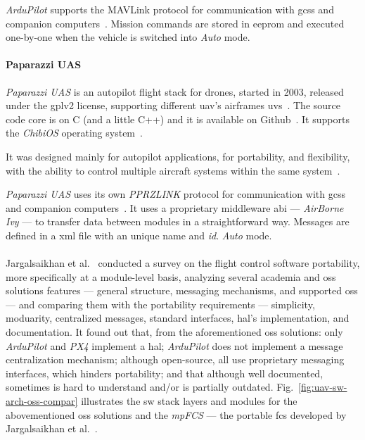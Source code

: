 \emph{ArduPilot} supports the MAVLink protocol for communication with
\glspl{gcs} and companion computers~\cite{arduPilot-home}. Mission commands are
stored in \gls{eeprom} and executed one-by-one when the vehicle is switched into
\emph{Auto} mode.


\paragraph{Paparazzi UAS}
%
\emph{Paparazzi UAS} is an autopilot flight stack for drones, started in 2003,
released under the \gls{gpl}v2 license, supporting different \gls{uav}'s airframes \glspl{uv}~\cite{paparazzi-home}. The source code core is on C (and a little C++) and it
is available on Github~\cite{paparazzi-github}.
It supports the \emph{ChibiOS} operating system~\cite{jargalsaikhan2022architectural}.

It was designed mainly for autopilot applications, for portability, and
flexibility, with the ability to control multiple aircraft systems within the
same system~\cite{paparazzi-home}.

\emph{Paparazzi UAS} uses its own \emph{PPRZLINK} protocol for communication
with \glspl{gcs} and companion computers~\cite{jargalsaikhan2022architectural}. It uses a proprietary middleware \gls{abi} ---
\emph{AirBorne Ivy} --- to transfer data between modules in a straightforward
way. Messages are defined in a \gls{xml} file with an unique name and \emph{id}.
\emph{Auto} mode.

\paragraph{}
Jargalsaikhan et al.~\cite{jargalsaikhan2022architectural} conducted a survey on the flight control software
portability, more specifically at a module-level basis, analyzing several
academia and \gls{oss} solutions features --- general structure, messaging
mechanisms, and supported \glspl{os} --- and comparing them with the portability
requirements --- simplicity, moduarity, centralized messages, standard
interfaces, \gls{hal}'s implementation, and documentation. It found out that,
from the aforementioned \gls{oss} solutions: only \emph{ArduPilot} and
\emph{PX4} implement a \gls{hal}; \emph{ArduPilot} does not implement a message
centralization mechanism; although open-source, all use proprietary messaging
interfaces, which hinders portability; and that although well documented,
sometimes is hard to understand and/or is partially
outdated. Fig.~\ref{fig:uav-sw-arch-oss-compar} illustrates the \gls{sw} stack
layers and modules for the abovementioned \gls{oss} solutions and the
\emph{mpFCS} --- the portable \gls{fcs} developed by Jargalsaikhan et al.~\cite{jargalsaikhan2022architectural}.

